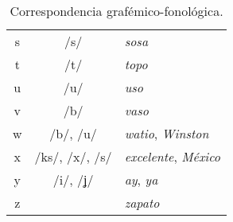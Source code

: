 \begin{table}[!ht]
\begin{tabular}{ccl}
		\textlangle{}s\textrangle{}&/s/  & \textit{sosa}\\
		\textlangle{}t\textrangle{}&/t/  & \textit{topo}\\
		\textlangle{}u\textrangle{}&/u/  & \textit{uso}\\
		\textlangle{}v\textrangle{}&/b/  & \textit{vaso}\\
		\textlangle{}w\textrangle{}&/b/, /u/  & \textit{watio}, \textit{Winston}\\
		\textlangle{}x\textrangle{}&/ks/, /x/, /s/  & \textit{excelente}, \textit{México}\\
		\textlangle{}y\textrangle{}&/i/, /ʝ/& \textit{ay}, \textit{ya}\\
		\textlangle{}z\textrangle{}&\textipa{/T/}  & \textit{zapato}\\	
		\bottomrule
	\end{tabular}
	\caption{Correspondencia grafémico-fonológica.}
	\label{tab:graffono}
\end{table}
